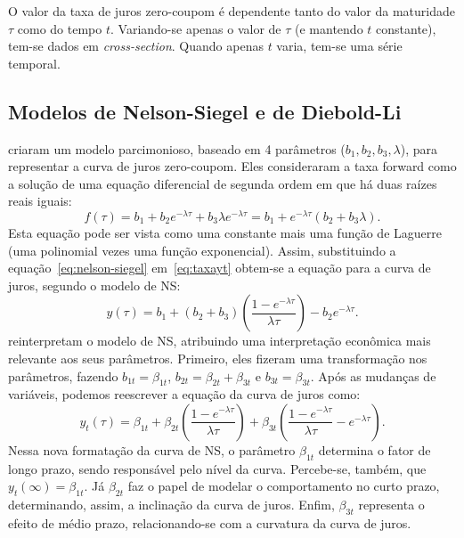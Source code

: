 \documentclass[
	12pt,				%
	openright,			%
	oneside,			%
	a4paper,			%
	english,			%
	brazil				%
	]{dissertacao-ufrgs-abntex2}
\begin{document}
O valor da taxa de juros zero-coupom é dependente tanto do valor da maturidade $\tau$ como do tempo $t$. 
Variando-se apenas o valor de $\tau$ (e mantendo $t$ constante),
tem-se dados em \emph{cross-section}. Quando apenas $t$ varia, tem-se
uma série temporal.





\subsection{Modelos de Nelson-Siegel e de Diebold-Li}

 criaram um modelo parcimonioso, baseado em 4 parâmetros
($b_{1},b_{2},b_{3},\lambda$), para representar a curva de juros
zero-coupom. Eles consideraram a taxa forward como a solução de uma
equação diferencial de segunda ordem em que há duas raízes reais iguais:
\begin{equation} \label{eq:nelson-siegel}
f(\tau)=b_{1}+b_{2}e^{-\lambda\tau}+b_{3}\lambda e^{-\lambda\tau}=b_1+e^{-\lambda \tau}(b_2+b_3 \lambda).
\end{equation}
Esta equação pode ser vista como uma constante mais uma função de
Laguerre (uma polinomial vezes uma função exponencial). Assim, substituindo a equação~\ref{eq:nelson-siegel} em~\ref{eq:taxayt}
obtem-se a equação para a curva de juros, segundo o modelo de NS:
\begin{equation}
y(\tau)=b_{1}+(b_{2}+b_{3})\left(\frac{1-e^{-\lambda\tau}}{\lambda\tau}\right)-b_{2}e^{-\lambda\tau}.
\end{equation}
 reinterpretam o modelo de NS, atribuindo uma interpretação econômica mais relevante
aos seus parâmetros. Primeiro, eles fizeram uma transformação nos
parâmetros, fazendo $b_{1t}=\beta_{1t}$, $b_{2t}=\beta_{2t}+\beta_{3t}$
e $b_{3t}=\beta_{3t}$. Após as mudanças de variáveis, podemos reescrever a equação da curva de juros como:
\begin{equation}
y_t(\tau)=\beta_{1t}+\beta_{2t}\left(\frac{1-e^{-\lambda\tau}}{\lambda\tau}\right)+\beta_{3t}\left(\frac{1-e^{-\lambda\tau}}{\lambda\tau}-e^{-\lambda\tau}\right).
\end{equation}
Nessa nova formatação da curva de NS, o parâmetro $\beta_{1t}$ determina
o fator de longo prazo, sendo responsável pelo nível da curva. Percebe-se,
também, que $y_{t}(\infty)=\beta_{1t}$. Já $\beta_{2t}$ faz o papel
de modelar o comportamento no curto prazo, determinando, assim, a
inclinação da curva de juros. Enfim, $\beta_{3t}$ representa o efeito
de médio prazo, relacionando-se com a curvatura da curva de juros.
\end{document}
